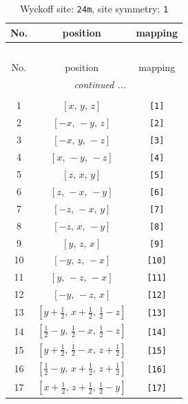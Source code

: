 \documentclass[fleqn,8pt]{jsarticle}
\begin{document}
\begin{longtable}{ccc}
\caption{Wyckoff site: {\tt 24m}, site symmetry: {\tt 1}}
 \\
 \hline \hline
No. & position & mapping \\ \hline \endfirsthead

\multicolumn{2}{l}{\tablename\ \thetable{}} \\
 \hline \hline
No. & position & mapping \\ \hline \endhead

 \hline \hline
\multicolumn{2}{r}{\footnotesize\it continued ...} \\ \endfoot

 \hline \hline
\multicolumn{2}{r}{} \\ \endlastfoot

1 & $\left[ x,\, y,\, z \right]$ & {\tt [1]} \\ \hline
2 & $\left[ - x,\, - y,\, z \right]$ & {\tt [2]} \\ \hline
3 & $\left[ - x,\, y,\, - z \right]$ & {\tt [3]} \\ \hline
4 & $\left[ x,\, - y,\, - z \right]$ & {\tt [4]} \\ \hline
5 & $\left[ z,\, x,\, y \right]$ & {\tt [5]} \\ \hline
6 & $\left[ z,\, - x,\, - y \right]$ & {\tt [6]} \\ \hline
7 & $\left[ - z,\, - x,\, y \right]$ & {\tt [7]} \\ \hline
8 & $\left[ - z,\, x,\, - y \right]$ & {\tt [8]} \\ \hline
9 & $\left[ y,\, z,\, x \right]$ & {\tt [9]} \\ \hline
10 & $\left[ - y,\, z,\, - x \right]$ & {\tt [10]} \\ \hline
11 & $\left[ y,\, - z,\, - x \right]$ & {\tt [11]} \\ \hline
12 & $\left[ - y,\, - z,\, x \right]$ & {\tt [12]} \\ \hline
13 & $\left[ y + \frac{1}{2},\, x + \frac{1}{2},\, \frac{1}{2} - z \right]$ & {\tt [13]} \\ \hline
14 & $\left[ \frac{1}{2} - y,\, \frac{1}{2} - x,\, \frac{1}{2} - z \right]$ & {\tt [14]} \\ \hline
15 & $\left[ y + \frac{1}{2},\, \frac{1}{2} - x,\, z + \frac{1}{2} \right]$ & {\tt [15]} \\ \hline
16 & $\left[ \frac{1}{2} - y,\, x + \frac{1}{2},\, z + \frac{1}{2} \right]$ & {\tt [16]} \\ \hline
17 & $\left[ x + \frac{1}{2},\, z + \frac{1}{2},\, \frac{1}{2} - y \right]$ & {\tt [17]} \\ \hline

\end{longtable}
\end{document}
